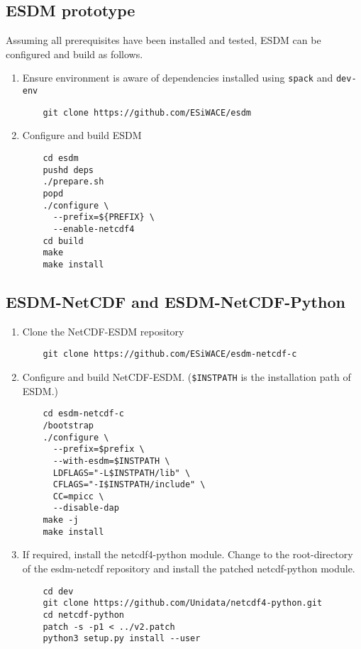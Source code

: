 \subsection{ESDM prototype}
Assuming all prerequisites have been installed and tested, ESDM can be configured and build as follows.
\begin{enumerate}
  \item Ensure environment is aware of dependencies installed using \lstinline|spack| and \lstinline|dev-env|
    \begin{lstlisting}
    git clone https://github.com/ESiWACE/esdm
    \end{lstlisting}
  \item Configure and build ESDM
    \begin{lstlisting}
    cd esdm
    pushd deps
    ./prepare.sh
    popd
    ./configure \
      --prefix=${PREFIX} \
      --enable-netcdf4
    cd build
    make
    make install
    \end{lstlisting}
\end{enumerate}


\subsection{ESDM-NetCDF and ESDM-NetCDF-Python}%
\begin{enumerate}
  \item Clone the NetCDF-ESDM repository
    \begin{lstlisting}
    git clone https://github.com/ESiWACE/esdm-netcdf-c
    \end{lstlisting}
  \item Configure and build NetCDF-ESDM. (\lstinline|$INSTPATH| is the installation path of ESDM.)
    \begin{lstlisting}
    cd esdm-netcdf-c
    /bootstrap
    ./configure \
      --prefix=$prefix \
      --with-esdm=$INSTPATH \
      LDFLAGS="-L$INSTPATH/lib" \
      CFLAGS="-I$INSTPATH/include" \
      CC=mpicc \
      --disable-dap
    make -j
    make install
    \end{lstlisting}
  \item If required, install the netcdf4-python module. 
    Change to the root-directory of the esdm-netcdf repository and install the patched netcdf-python module.
    \begin{lstlisting}
    cd dev
    git clone https://github.com/Unidata/netcdf4-python.git
    cd netcdf-python
    patch -s -p1 < ../v2.patch
    python3 setup.py install --user
    \end{lstlisting}
\end{enumerate}

